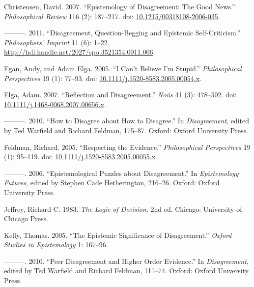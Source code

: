 \documentclass[
  11pt,
  letterpaper,
  DIV=11,
  numbers=noendperiod,
  twoside]{scrartcl}
\newlength{\cslhangindent}
\newenvironment{CSLReferences}[2] %
 {\begin{list}{}{%
  \setlength{\itemindent}{0pt}
  \setlength{\leftmargin}{0pt}
  \setlength{\parsep}{0pt}
  \ifodd #1
   \setlength{\leftmargin}{\cslhangindent}
   \setlength{\itemindent}{-1\cslhangindent}
  \fi
  \setlength{\itemsep}{#2\baselineskip}}}
 {\end{list}}
\begin{document}
\label{refs}
\begin{CSLReferences}{1}{0}
Christensen, David. 2007. {``Epistemology of Disagreement: The Good
News.''} \emph{Philosophical Review} 116 (2): 187--217. doi:
\href{https://doi.org/10.1215/00318108-2006-035}{10.1215/00318108-2006-035}.

---------. 2011. {``Disagreement, Question-Begging and Epistemic
Self-Criticism.''} \emph{Philosophers' Imprint} 11 (6): 1--22.
\url{http://hdl.handle.net/2027/spo.3521354.0011.006}.

Egan, Andy, and Adam Elga. 2005. {``{I Can't Believe I'm Stupid}.''}
\emph{Philosophical Perspectives} 19 (1): 77--93. doi:
\href{https://doi.org/10.1111/j.1520-8583.2005.00054.x}{10.1111/j.1520-8583.2005.00054.x}.

Elga, Adam. 2007. {``Reflection and Disagreement.''} \emph{No{û}s} 41
(3): 478--502. doi:
\href{https://doi.org/10.1111/j.1468-0068.2007.00656.x}{10.1111/j.1468-0068.2007.00656.x}.

---------. 2010. {``How to Disagree about How to Disagree.''} In
\emph{Disagreement}, edited by Ted Warfield and Richard Feldman,
175--87. Oxford: Oxford University Press.

Feldman, Richard. 2005. {``Respecting the Evidence.''}
\emph{Philosophical Perspectives} 19 (1): 95--119. doi:
\href{https://doi.org/10.1111/j.1520-8583.2005.00055.x}{10.1111/j.1520-8583.2005.00055.x}.

---------. 2006. {``Epistemological Puzzles about Disagreement.''} In
\emph{Epistemology Futures}, edited by Stephen Cade Hetherington,
216--26. Oxford: Oxford University Press.

Jeffrey, Richard C. 1983. \emph{The Logic of Decision}. 2nd ed. Chicago:
University of Chicago Press.

Kelly, Thomas. 2005. {``The Epistemic Significance of Disagreement.''}
\emph{Oxford Studies in Epistemology} 1: 167--96.

---------. 2010. {``Peer Disagreement and Higher Order Evidence.''} In
\emph{Disagreement}, edited by Ted Warfield and Richard Feldman,
111--74. Oxford: Oxford University Press.


\end{CSLReferences}
\end{document}
